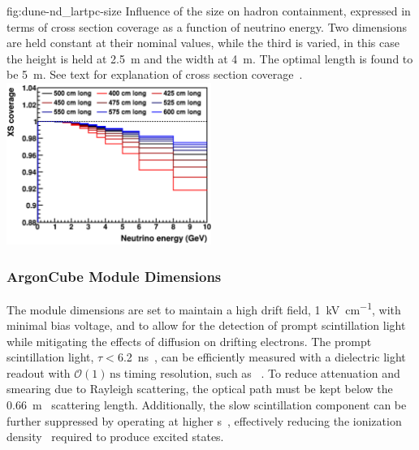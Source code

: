 \begin{dunefigure}{fig:dune-nd_lartpc-size}
{Influence of the  size on hadron containment, expressed in terms of cross section coverage as a function of neutrino energy.
		Two dimensions are held constant at their nominal values, while the third is varied, in this case the height is held at \SI{2.5}{\metre} and the width at \SI{4}{\metre}.
		The optimal length is found to be \SI{5}{\metre}.
		See text for explanation of cross section coverage~\cite{lartpcSizeChris}.}
	\includegraphics[width=0.5\textwidth]{graphics/length.png}
\end{dunefigure}

\subsubsection{ArgonCube Module Dimensions}

The     module dimensions are set to maintain a high drift field, \SI{1}{\kilo\volt\per\centi\metre}, with minimal bias voltage, and to allow for the detection of prompt scintillation light while mitigating the effects of diffusion on drifting electrons.
The prompt scintillation light, $\tau<$\SI{6.2}{\nano\second}~\cite{Heindl:2015yaa}, can be efficiently measured with a dielectric light readout with $\mathcal{O}\left(1\right)\,\mathrm{ns}$ timing resolution, such as ~\cite{Auger:2017flc}.
To reduce attenuation and smearing due to Rayleigh scattering, the optical path must be kept below the \SI{0.66}{\metre}~\cite{Grace:2015yta} scattering length.   Additionally, the slow scintillation component can be further suppressed by operating at higher \efield{}s~\cite{PhysRevB.20.3486}, effectively reducing the ionization density~\cite{PhysRevB.27.5279} required to produce excited states. 


